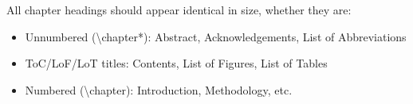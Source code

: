 \documentclass[12pt,oneside,a4paper]{report}
\begin{document}
\vspace{1cm}

All chapter headings should appear identical in size, whether they are:
\begin{itemize}
\item Unnumbered (\textbackslash chapter*): Abstract, Acknowledgements, List of Abbreviations
\item ToC/LoF/LoT titles: Contents, List of Figures, List of Tables
\item Numbered (\textbackslash chapter): Introduction, Methodology, etc.
\end{itemize}
\end{document}
